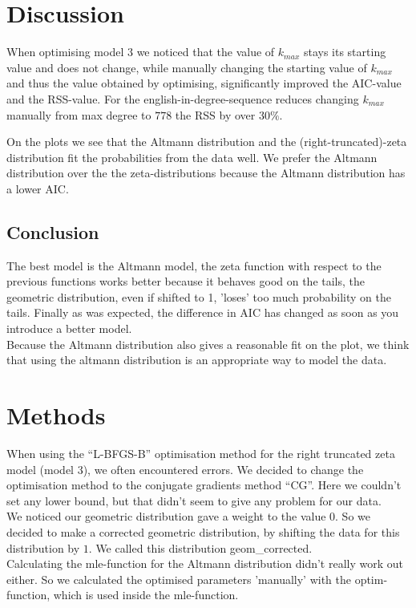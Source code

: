 \documentclass[paper=a4, fontsize=11pt]{scrartcl} %
\theoremstyle{plain}
\begin{document}
\newpage

\section{Discussion}
When optimising model $3$ we noticed that the value of $k_{max}$ stays its starting value and does not change, while manually changing the starting value of $k_{max}$ and thus the value obtained by optimising, significantly improved the AIC-value and the RSS-value. For the english-in-degree-sequence reduces changing $k_{max}$ manually from max degree to $778$ the RSS by over $30\%$.

On the plots we see that the Altmann distribution and the (right-truncated)-zeta distribution fit the probabilities from the data well. We prefer the Altmann distribution over the the zeta-distributions because the Altmann distribution has a lower AIC.

\subsection{Conclusion}
The best model is the Altmann model, the zeta function with respect to the previous functions works better because it behaves good on the tails, the geometric distribution, even if shifted to 1, 'loses' too much probability on the tails.
Finally as was expected, the difference in AIC has changed as soon as you introduce a better model.\\

Because the Altmann distribution also gives a reasonable fit on the plot, we think that using the altmann distribution is an appropriate way to model the data.

\section{Methods}
When using the ``L-BFGS-B'' optimisation method for the right truncated zeta model (model $3$), we often encountered errors. We decided to change the optimisation method to the conjugate gradients method ``CG''. Here we couldn't set any lower bound, but that didn't seem to give any problem for our data.\\

We noticed our geometric distribution gave a weight to the value $0$. So we decided to make a corrected geometric distribution, by shifting the data for this distribution by $1$. We called this distribution geom\_corrected.\\

Calculating the mle-function for the Altmann distribution didn't really work out either. So we calculated the optimised parameters 'manually' with the optim-function, which is used inside the mle-function.
\end{document}
